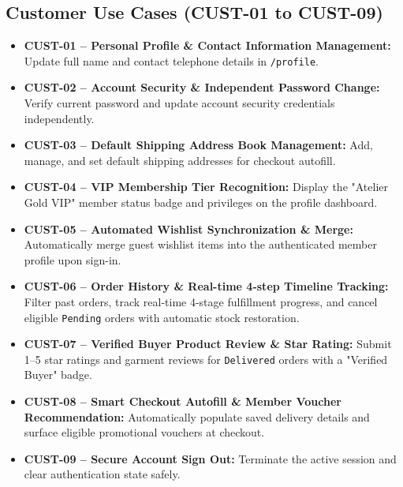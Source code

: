 \documentclass[12pt,a4paper,oneside]{report}
\begin{document}
\subsection{Customer Use Cases (CUST-01 to CUST-09)}
\begin{itemize}[leftmargin=1.2cm]
    \item \textbf{CUST-01 -- Personal Profile \& Contact Information Management:} Update full name and contact telephone details in \texttt{/profile}.
    \item \textbf{CUST-02 -- Account Security \& Independent Password Change:} Verify current password and update account security credentials independently.
    \item \textbf{CUST-03 -- Default Shipping Address Book Management:} Add, manage, and set default shipping addresses for checkout autofill.
    \item \textbf{CUST-04 -- VIP Membership Tier Recognition:} Display the "Atelier Gold VIP" member status badge and privileges on the profile dashboard.
    \item \textbf{CUST-05 -- Automated Wishlist Synchronization \& Merge:} Automatically merge guest wishlist items into the authenticated member profile upon sign-in.
    \item \textbf{CUST-06 -- Order History \& Real-time 4-step Timeline Tracking:} Filter past orders, track real-time 4-stage fulfillment progress, and cancel eligible \texttt{Pending} orders with automatic stock restoration.
    \item \textbf{CUST-07 -- Verified Buyer Product Review \& Star Rating:} Submit 1--5 star ratings and garment reviews for \texttt{Delivered} orders with a "Verified Buyer" badge.
    \item \textbf{CUST-08 -- Smart Checkout Autofill \& Member Voucher Recommendation:} Automatically populate saved delivery details and surface eligible promotional vouchers at checkout.
    \item \textbf{CUST-09 -- Secure Account Sign Out:} Terminate the active session and clear authentication state safely.
\end{itemize}
\end{document}
